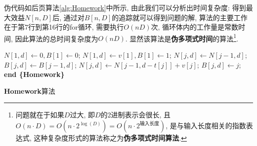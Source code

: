 \documentclass{article}
\begin{document}
\begin{homeworkProblem}
	伪代码如后页算法\ref{alg:Homework}中所示, 由此我们可以分析出时间复杂度: 得到最大效益$N[n,D]$后, 通过对$B[n,D]$的追踪就可以得到问题的解, 算法的主要工作在于第7行到第16行的for循环, 需要执行$O(nD)$次, 循环体内的工作量是常数时间, 因此算法的总时间复杂度为$O(nD)$. 显然该算法是\textbf{伪多项式时间}的算法\footnote{问题就在于如果$D$过大, 即$D$的2进制表示会很长, 且$O\left( n\cdot D \right) =O\left( n\cdot 2^{\log \left( D \right)} \right) =O\left( n\cdot 2^{\text{输入长度}} \right)$, 是与输入长度相关的指数表达式, 这种复杂度形式的算法称之为\textbf{伪多项式时间算法}.}.
	\newpage
	\begin{algorithm}[H]
		\begin{algorithmic}[1]
			\State $N[1,d]\gets 0,B[1]\gets 0$;
		\EndFor
			\State $N[1,d]\gets v[1],B[1]\gets 1$;
		\EndFor
				\State $N[j,d]\gets N[j-1,d]$;
				\State $B[j,d]\gets B[j-1,d]$;
					\State $N[j,d]\gets N[j-1,d-t[j]]+v[j]$;
					\State $B[j,d]\gets j$;
				\EndIf
			\EndFor
		\EndFor
		\State \textbf{end \{Homework\}}
		\end{algorithmic}
		\caption{\textbf{Homework}算法}
		\label{alg:Homework}
	\end{algorithm}
\end{homeworkProblem}
\end{document}
